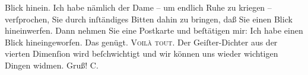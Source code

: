 \begin{ledgroupsized}[t]{13cm}
                    Blick hinein. Ich habe nämlich der Dame – um endlich Ruhe zu kriegen –
                    verſprochen, Sie durch inſtändiges Bitten dahin zu bringen, daß Sie einen Blick
                    hineinwerfen. Dann nehmen Sie eine Postkarte und beſtätigen mir: Ich habe einen
                    Blick hineingeworfen. Das genügt. \textsc{Voilà tout}. Der
                    Geiſter-Dichter aus der vierten Dimenſion wird beſchwichtigt und wir können uns
                    wieder wichtigen Dingen widmen. Gruß! \spacefill\mbox{C.}\pend
                     \endnumbering{}\end{ledgroupsized}  \newcommand{\dateiname}{L01362}\newcommand{\titel}{Michael Georg Conrad an Arthur Schnitzler, 22. 1. 1904}\newcommand{\editorInnen}{Martin Anton Müller und Gerd-Hermann Susen}
      